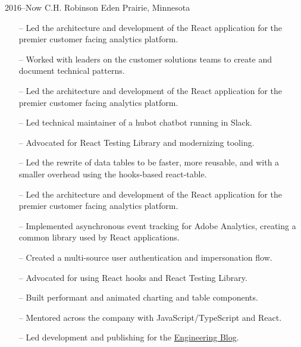 \documentclass[]{cv-style} %
\begin{document}
\begin{entrylist}

\entry
{2016--Now}
{C.H. Robinson}
{Eden Prairie, Minnesota}
{
\begin{itemize}
    \item[--] Led the architecture and development of the React application for the premier customer facing analytics platform.
    \item[--] Worked with leaders on the customer solutions teams to create and document technical patterns.
\end{itemize}

\begin{itemize}
    \item[--] Led the architecture and development of the React application for the premier customer facing analytics platform.
    \item[--] Led technical maintainer of a hubot chatbot running in Slack.
    \item[--] Advocated for React Testing Library and modernizing tooling.
    \item[--] Led the rewrite of data tables to be faster, more reusable, and with a smaller overhead using the hooks-based react-table.
\end{itemize}

\begin{itemize}
    \item[--] Led the architecture and development of the React application for the premier customer facing analytics platform.
    \item[--] Implemented asynchronous event tracking for Adobe Analytics, creating a common library used by React applications.
    \item[--] Created a multi-source user authentication and impersonation flow.
    \item[--] Advocated for using React hooks and React Testing Library.
    \item[--] Built performant and animated charting and table components.
    \item[--] Mentored across the company with JavaScript/TypeScript and React.
    \item[--] Led development and publishing for the \href{https://engineering.chrobinson.com}{Engineering Blog}.
\end{itemize}

}
\end{entrylist}
\end{document}
